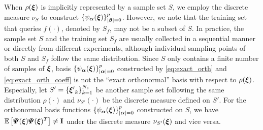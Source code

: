 When $\rho(\bm\xi)$ is implicitly represented by a sample set $S$, we employ the discrete measure $\nu_S$ to construct $\left\{\psi_{\bm\alpha}(\bm\xi)\right\}_{\vert \bm\beta \vert = 0}^{p}$. 
However, we note that the training set that queries $f(\cdot)$, denoted by $S_f$, may not be a subset of $S$.
In practice, the sample set $S$ and the training set $S_f$ are usually collected in a sequential manner or directly from different experiments, although individual sampling points of both $S$ and $S_f$ follow the same distribution.
Since $S$ only contains a finite number of samples of $\bm\xi$, basis $\left\{\psi_{\bm\alpha}(\bm\xi)\right\}_{\vert \bm\alpha \vert = 0}^{p}$  constructed by \eqref{eq:exact_orth} and \eqref{eq:exact_orth_coeff} is not the ``exact orthonormal'' basis with respect to $\rho(\bm\xi)$.
Especially, let $S' = \left\{{\bm\xi'}_k\right\}_{k = 1}^{N_s}$ be another sample set following the same distribution $\rho(\cdot)$ and $\nu_{S'}(\cdot)$ be the discrete measure defined on $S'$.
For the orthonormal  basis functions $\left\{\psi_{\bm\alpha}(\bm\xi)\right\}_{\vert \bm\alpha \vert = 0}^{p}$ 
constructed on $S$, we have $\mathbb{E}\left[ \bm{\varPsi}(\bm\xi) \bm{\varPsi}(\bm\xi)^T \right] \neq \mathbf{I}$ 
under the discrete measure $\nu_{S'}(\bm\xi)$ and vice versa.

